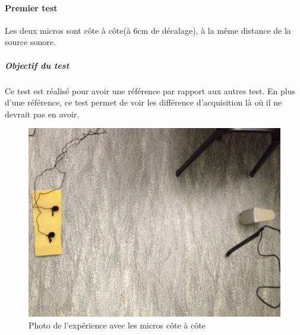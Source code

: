 \documentclass[12pt,a4paper]{report}
\begin{document}
 \paragraph{Premier test} 
 Les deux micros sont côte à côte(à 6cm de décalage), à la même distance de la source sonore.
 \subparagraph{Objectif du test}
 Ce test est réalisé pour avoir une référence par rapport aux autres test. En plus d'une référence, ce test permet de voir les différence d'acquisition là où il ne devrait pas en avoir.
 \begin{figure}[H]
 \includegraphics[width=\textwidth]{../tests/lecture_de_signaux_carres/donnees11-03/test_1.jpg} 
 \caption{Photo de l'expérience avec les micros côte à côte}
 \end{figure}
 	
\end{document}
